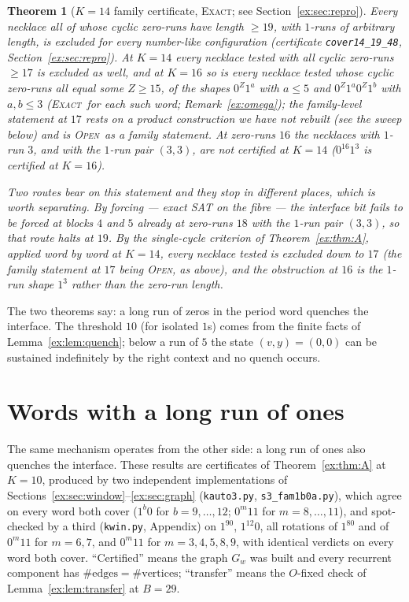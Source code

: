 \documentclass[11pt]{article}
\newtheorem{theorem}{Theorem}[section]
\theoremstyle{definition}
\theoremstyle{remark}
\newcommand{\EXACT}{\textsc{Exact}}
\newcommand{\OPEN}{\textsc{Open}}
\begin{document}
\begin{theorem}[$K=14$ family certificate, \EXACT; see Section~\ref{ex:sec:repro}]\label{ex:thm:19}
Every necklace all of whose cyclic zero-runs have length $\ge19$, with $1$-runs of arbitrary length, is excluded for every number-like configuration (certificate \texttt{cover14\_19\_48}, Section~\ref{ex:sec:repro}). At $K=14$ every necklace tested with all cyclic zero-runs $\ge17$ is excluded as well, and at $K=16$ so is every necklace tested whose cyclic zero-runs all equal some $Z\ge15$, of the shapes $0^Z1^a$ with $a\le5$ and $0^Z1^a0^Z1^b$ with $a,b\le3$ (\EXACT\ for each such word; Remark~\ref{ex:omega}); the family-level statement at $17$ rests on a product construction we have not rebuilt (see the sweep below) and is \OPEN\ as a family statement. At zero-runs $16$ the necklaces with $1$-run $3$, and with the $1$-run pair $(3,3)$, are not certified at $K=14$ ($0^{16}1^3$ is certified at $K=16$).

Two routes bear on this statement and they stop in different places, which is worth separating. By \emph{forcing} --- exact SAT on the fibre --- the interface bit fails to be forced at blocks $4$ and $5$ already at zero-runs $18$ with the $1$-run pair $(3,3)$, so that route halts at $19$. By the \emph{single-cycle} criterion of Theorem~\ref{ex:thm:A}, applied word by word at $K=14$, every necklace tested is excluded down to $17$ (the family statement at $17$ being \OPEN, as above), and the obstruction at $16$ is the $1$-run shape $1^3$ rather than the zero-run length.
\end{theorem}

The two theorems say: a long run of zeros in the period word quenches the interface. The threshold $10$ (for isolated $1$s) comes from the finite facts of Lemma~\ref{ex:lem:quench}; below a run of $5$ the state $(v,y)=(0,0)$ can be sustained indefinitely by the right context and no quench occurs.

\section{Words with a long run of ones}

The same mechanism operates from the other side: a long run of ones also quenches the interface. These results are certificates of Theorem~\ref{ex:thm:A} at $K=10$, produced by two independent implementations of Sections~\ref{ex:sec:window}--\ref{ex:sec:graph} (\texttt{kauto3.py}, \texttt{s3\_fam1b0a.py}), which agree on every word both cover ($1^b0$ for $b=9,\dots,12$; $0^m11$ for $m=8,\dots,11$), and spot-checked by a third (\texttt{kwin.py}, Appendix) on $1^90$, $1^{12}0$, all rotations of $1^80$ and of $0^m11$ for $m=6,7$, and $0^m11$ for $m=3,4,5,8,9$, with identical verdicts on every word both cover. ``Certified'' means the graph $G_w$ was built and every recurrent component has $\#\text{edges}=\#\text{vertices}$; ``transfer'' means the $O$-fixed check of Lemma~\ref{ex:lem:transfer} at $B=29$.
\end{document}
